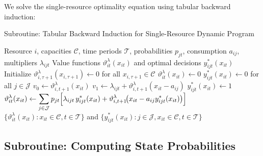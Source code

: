 \documentclass[11pt]{article}
\begin{document}
\noindent
We solve the single-resource optimality equation using tabular backward induction:

\begin{algorithm}[H]
\caption{Subroutine: Tabular Backward Induction for Single-Resource Dynamic Program}
\label{alg:solve_sdp}
\begin{algorithmic}[1]
\Require Resource $i$, capacities $\mathcal{C}$, time periods $\mathcal{T}$, probabilities $p_{jt}$, consumption $a_{ij}$, multipliers $\lambda_{ijt}$
\Ensure Value functions $\vartheta^\lambda_{it}(x_{it})$ and optimal decisions $y^*_{ijt}(x_{it})$
\State Initialize $\vartheta^\lambda_{i,\tau+1}(x_{i,\tau+1}) \gets 0$ for all $x_{i,\tau+1} \in \mathcal{C}$ 
 
     
        \State $\vartheta^\lambda_{it}(x_{it}) \gets 0$
        \State $y^*_{ijt}(x_{it}) \gets 0$ for all $j \in \mathcal{J}$ 
         
             
                \State $v_0 \gets \vartheta^\lambda_{i,t+1}(x_{it})$ 
                \State $v_1 \gets \lambda_{ijt} + \vartheta^\lambda_{i,t+1}(x_{it} - a_{ij})$ 
                    \State $y^*_{ijt}(x_{it}) \gets 1$ 
                \EndIf
            \EndIf
        \EndFor
        \State $\displaystyle \vartheta^\lambda_{it}(x_{it}) \gets \sum_{j\in\mathcal{J}} p_{jt}\Bigl[ \lambda_{ijt}\,y^*_{ijt}(x_{it}) + \vartheta^\lambda_{i,t+1}\!\bigl(x_{it}-a_{ij}y^*_{ijt}(x_{it})\bigr) \Bigr]$
    \EndFor
\EndFor
\State \Return $\{\vartheta^\lambda_{it}(x_{it}): x_{it} \in \mathcal{C}, t \in \mathcal{T}\}$ and $\{y^*_{ijt}(x_{it}): j \in \mathcal{J}, x_{it} \in \mathcal{C}, t \in \mathcal{T}\}$
\end{algorithmic}
\end{algorithm}

\vspace{0.5cm}



\newpage

\subsection{Subroutine: Computing State Probabilities}
\end{document}

